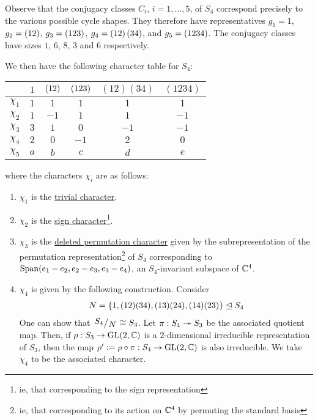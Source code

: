 \begin{example}[$S_4$]
    Observe that the conjugacy classes $C_i$, $i = 1, \ldots, 5$, of $S_4$ correspond precisely to the various possible cycle shapes. They therefore have representatives $g_1 = 1$, $g_2 = \left( 12 \right)$, $g_3 = \left( 123 \right)$, $g_4 = \left( 12 \right)\left( 34 \right)$, and $g_5 = \left( 1234 \right)$. The conjugacy classes have sizes $1$, $6$, $8$, $3$ and $6$ respectively.

    We then have the following character table for $S_4$:
    \begin{table}[H]
        \centering
        \begin{tabular}{c|ccccc}
            & $1$ & $\left( 12 \right)$ & $\left( 123 \right)$ & $(12)(34)$ & $(1234)$ \\
            \hline
            $\chi_1$ & $1$ & $1$ & $1$ & $1$ & $1$ \\
            $\chi_2$ & $1$ & $-1$ & $1$ & $1$ & $-1$ \\
            $\chi_3$ & $3$ & $1$ & $0$ & $-1$ & $-1$ \\
            $\chi_4$ & $2$ & $0$ & $-1$ & $2$ & $0$ \\
            $\chi_5$ & $a$ & $b$ & $c$ & $d$ & $e$
        \end{tabular}
    \end{table}
    where the characters $\chi_i$ are as follows:
    \begin{enumerate}
        \item $\chi_1$ is the \underline{trivial character}.
        
        \item $\chi_2$ is the \underline{sign character}\footnote{ie, that corresponding to the sign representation}.
        
        \item $\chi_3$ is the \underline{deleted permutation character} given by the subrepresentation of the permutation representation\footnote{ie, that corresponding to its action on $\mathbb{C}^4$ by permuting the standard basis} of $S_4$ corresponding to $\operatorname{Span}\!\left( e_1 - e_2, e_2 - e_3, e_3 - e_4 \right)$, an $S_4$-invariant subspace of $\mathbb{C}^4$.
        
        \item $\chi_4$ is given by the following construction. Consider
        \begin{align*}
            N = \left\{ 1, (12)(34), (13)(24), (14)(23) \right\} \trianglelefteq S_4
        \end{align*}
        One can show that $\quotient{S_4}{N} \cong S_3$. Let $\pi : S_4 \twoheadrightarrow S_3$ be the associated quotient map. Then, if $\rho : S_3 \to \operatorname{GL}\!\left( 2, \mathbb{C} \right)$ is a $2$-dimensional irreducible representation of $S_3$, then the map $\rho' := \rho \circ \pi : S_4 \to \operatorname{GL}\!\left( 2, \mathbb{C} \right)$ is also irreducible. We take $\chi_4$ to be the associated character.


\end{enumerate}
\end{example}
